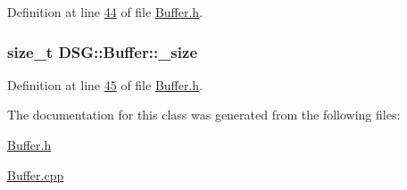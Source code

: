 Definition at line \hyperlink{_buffer_8h_source_l00044}{44} of file \hyperlink{_buffer_8h_source}{Buffer.\+h}.

\hypertarget{class_d_s_g_1_1_buffer_a4e2fef9ed617af2554b25c999def8f71}{
\subsubsection[{\+\_\+size}]{\setlength{\rightskip}{0pt plus 5cm}size\+\_\+t D\+S\+G\+::\+Buffer\+::\+\_\+size\hspace{0.3cm}{\ttfamily [protected]}}}\label{class_d_s_g_1_1_buffer_a4e2fef9ed617af2554b25c999def8f71}


Definition at line \hyperlink{_buffer_8h_source_l00045}{45} of file \hyperlink{_buffer_8h_source}{Buffer.\+h}.



The documentation for this class was generated from the following files\+:\begin{DoxyCompactItemize}
\item 
\hyperlink{_buffer_8h}{Buffer.\+h}\item 
\hyperlink{_buffer_8cpp}{Buffer.\+cpp}\end{DoxyCompactItemize}

